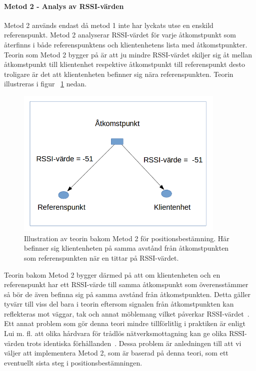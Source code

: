 \documentclass[a4paper,12pt]{article}
\begin{document}
 \paragraph{Metod 2 - Analys av RSSI-värden}
 \leavevmode\newline
Metod 2 används endast då metod 1 inte har lyckats utse en enskild referenspunkt. Metod 2  analyserar RSSI-värdet för varje åtkomstpunkt som återfinns i både referenspunktens och klientenhetens lista med åtkomstpunkter.
Teorin som Metod 2 bygger på är att ju mindre RSSI-värdet skiljer sig åt mellan åtkomstpunkt till klientenhet respektive åtkomstpunkt till referenspunkt desto troligare är det att
klientenheten befinner sig nära referenspunkten.
Teorin illustreras i figur ~\ref{fig:TEO2} nedan.

 \begin{figure}[H]
   \centering
   \includegraphics[width=10cm]{media/TeoriMetod2.png}
   \caption{Illustration av teorin bakom Metod 2 för positionsbestämning. Här befinner sig klientenheten på samma avstånd från åtkomstpunkten som referenspunkten när en tittar på RSSI-värdet.}
   \label{fig:TEO2}
 \end{figure}

 Teorin bakom Metod 2 bygger därmed på att om klientenheten och en referenspunkt har ett RSSI-värde till samma åtkomspunkt som överensstämmer så bör de även befinna sig på samma avstånd från åtkomstpunkten. Detta gäller tyvärr till viss del bara i teorin eftersom signalen från åtkomstpunkten kan reflekteras mot väggar, tak och annat möblemang vilket påverkar RSSI-värdet~\cite{zanca2008experimental}. Ett annat problem som gör denna teori mindre tillförlitlig i praktiken är enligt Lui m. fl. att olika hårdvara för trådlös nätverksmottagning kan ge olika RSSI-värden trots identiska förhållanden~\cite{problem_with_RSSI}. Dessa problem är anledningen till att vi väljer att implementera Metod 2, som är baserad på denna teori, som ett eventuellt sista steg i positionsbestämningen.
\end{document}
